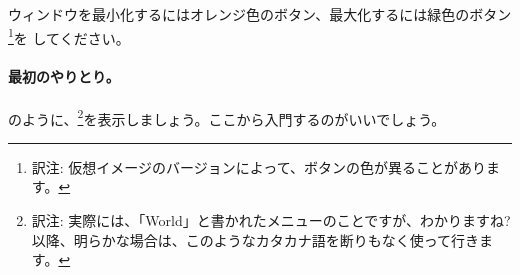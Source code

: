 \documentclass[a4paper,10pt,twoside]{book}
\begin{document}

ウィンドウを最小化するにはオレンジ色のボタン、最大化するには緑色のボタン\footnote{訳注: 仮想イメージのバージョンによって、ボタンの色が異ることがあります。}を \click してください。

\paragraph{最初のやりとり。}

のように、\footnote{訳注: 実際には、「World」と書かれたメニューのことですが、わかりますね? 以降、明らかな場合は、このようなカタカナ語を断りもなく使って行きます。}を表示しましょう。ここから入門するのがいいでしょう。


\end{document}
